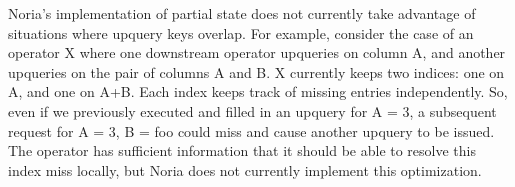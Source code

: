 Noria's implementation of partial state does not currently take advantage of
situations where upquery keys overlap. For example, consider the case of an
operator X where one downstream operator upqueries on column A, and another
upqueries on the pair of columns A and B. X currently keeps two indices: one on
A, and one on A+B. Each index keeps track of missing entries independently. So,
even if we previously executed and filled in an upquery for A = 3, a subsequent
request for A = 3, B = foo could miss and cause another upquery to be issued.
The operator has sufficient information that it should be able to resolve this
index miss locally, but Noria does not currently implement this optimization.
